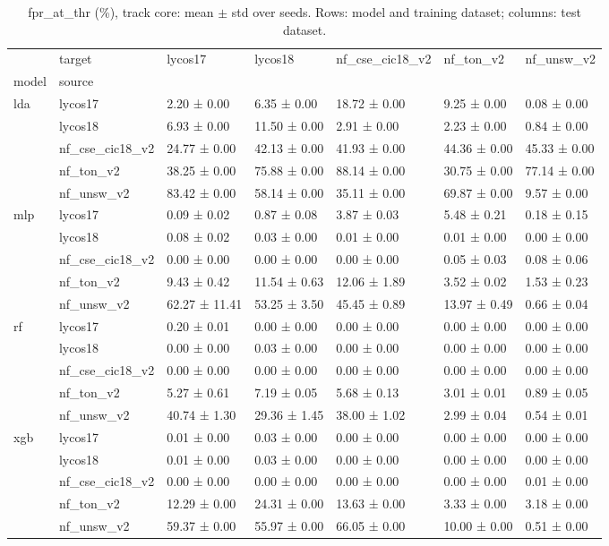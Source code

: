 \begin{table}
\caption{fpr_at_thr (\%), track core: mean $\pm$ std over seeds. Rows: model and training dataset; columns: test dataset.}
\label{tab:matrix_core_fpr_at_thr}
\begin{tabular}{lllllll}
\toprule
 & target & lycos17 & lycos18 & nf_cse_cic18_v2 & nf_ton_v2 & nf_unsw_v2 \\
model & source &  &  &  &  &  \\
\midrule
\multirow[t]{5}{*}{lda} & lycos17 & 2.20 ± 0.00 & 6.35 ± 0.00 & 18.72 ± 0.00 & 9.25 ± 0.00 & 0.08 ± 0.00 \\
 & lycos18 & 6.93 ± 0.00 & 11.50 ± 0.00 & 2.91 ± 0.00 & 2.23 ± 0.00 & 0.84 ± 0.00 \\
 & nf_cse_cic18_v2 & 24.77 ± 0.00 & 42.13 ± 0.00 & 41.93 ± 0.00 & 44.36 ± 0.00 & 45.33 ± 0.00 \\
 & nf_ton_v2 & 38.25 ± 0.00 & 75.88 ± 0.00 & 88.14 ± 0.00 & 30.75 ± 0.00 & 77.14 ± 0.00 \\
 & nf_unsw_v2 & 83.42 ± 0.00 & 58.14 ± 0.00 & 35.11 ± 0.00 & 69.87 ± 0.00 & 9.57 ± 0.00 \\
\cline{1-7}
\multirow[t]{5}{*}{mlp} & lycos17 & 0.09 ± 0.02 & 0.87 ± 0.08 & 3.87 ± 0.03 & 5.48 ± 0.21 & 0.18 ± 0.15 \\
 & lycos18 & 0.08 ± 0.02 & 0.03 ± 0.00 & 0.01 ± 0.00 & 0.01 ± 0.00 & 0.00 ± 0.00 \\
 & nf_cse_cic18_v2 & 0.00 ± 0.00 & 0.00 ± 0.00 & 0.00 ± 0.00 & 0.05 ± 0.03 & 0.08 ± 0.06 \\
 & nf_ton_v2 & 9.43 ± 0.42 & 11.54 ± 0.63 & 12.06 ± 1.89 & 3.52 ± 0.02 & 1.53 ± 0.23 \\
 & nf_unsw_v2 & 62.27 ± 11.41 & 53.25 ± 3.50 & 45.45 ± 0.89 & 13.97 ± 0.49 & 0.66 ± 0.04 \\
\cline{1-7}
\multirow[t]{5}{*}{rf} & lycos17 & 0.20 ± 0.01 & 0.00 ± 0.00 & 0.00 ± 0.00 & 0.00 ± 0.00 & 0.00 ± 0.00 \\
 & lycos18 & 0.00 ± 0.00 & 0.03 ± 0.00 & 0.00 ± 0.00 & 0.00 ± 0.00 & 0.00 ± 0.00 \\
 & nf_cse_cic18_v2 & 0.00 ± 0.00 & 0.00 ± 0.00 & 0.00 ± 0.00 & 0.00 ± 0.00 & 0.00 ± 0.00 \\
 & nf_ton_v2 & 5.27 ± 0.61 & 7.19 ± 0.05 & 5.68 ± 0.13 & 3.01 ± 0.01 & 0.89 ± 0.05 \\
 & nf_unsw_v2 & 40.74 ± 1.30 & 29.36 ± 1.45 & 38.00 ± 1.02 & 2.99 ± 0.04 & 0.54 ± 0.01 \\
\cline{1-7}
\multirow[t]{5}{*}{xgb} & lycos17 & 0.01 ± 0.00 & 0.03 ± 0.00 & 0.00 ± 0.00 & 0.00 ± 0.00 & 0.00 ± 0.00 \\
 & lycos18 & 0.01 ± 0.00 & 0.03 ± 0.00 & 0.00 ± 0.00 & 0.00 ± 0.00 & 0.00 ± 0.00 \\
 & nf_cse_cic18_v2 & 0.00 ± 0.00 & 0.00 ± 0.00 & 0.00 ± 0.00 & 0.00 ± 0.00 & 0.01 ± 0.00 \\
 & nf_ton_v2 & 12.29 ± 0.00 & 24.31 ± 0.00 & 13.63 ± 0.00 & 3.33 ± 0.00 & 3.18 ± 0.00 \\
 & nf_unsw_v2 & 59.37 ± 0.00 & 55.97 ± 0.00 & 66.05 ± 0.00 & 10.00 ± 0.00 & 0.51 ± 0.00 \\
\cline{1-7}
\bottomrule
\end{tabular}
\end{table}
